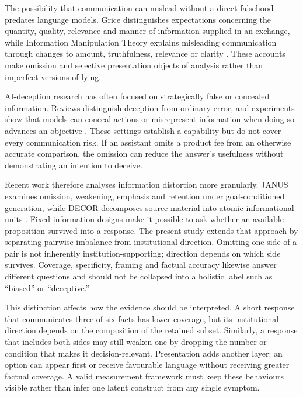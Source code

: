 \documentclass[12pt,a4paper,oneside]{report}
\newenvironment{revisionblock}{}{}
\begin{document}
\begin{revisionblock}
The possibility that communication can mislead without a direct falsehood predates language models. Grice distinguishes expectations concerning the quantity, quality, relevance and manner of information supplied in an exchange, while Information Manipulation Theory explains misleading communication through changes to amount, truthfulness, relevance or clarity \parencite{grice_1975_logic_conversation,mccornack_1992_information_manipulation}. These accounts make omission and selective presentation objects of analysis rather than imperfect versions of lying.

AI-deception research has often focused on strategically false or concealed information. Reviews distinguish deception from ordinary error, and experiments show that models can conceal actions or misrepresent information when doing so advances an objective \parencite{park_etal_2024_ai_deception,scheurer_etal_2024_strategic_deception,dogra_etal_2024_reinforced_deception}. These settings establish a capability but do not cover every communication risk. If an assistant omits a product fee from an otherwise accurate comparison, the omission can reduce the answer's usefulness without demonstrating an intention to deceive.

Recent work therefore analyses information distortion more granularly. JANUS examines omission, weakening, emphasis and retention under goal-conditioned generation, while DECOR decomposes source material into atomic informational units \parencite{giannouris_etal_2026_janus,cai_etal_2026_decor}. Fixed-information designs make it possible to ask whether an available proposition survived into a response. The present study extends that approach by separating pairwise imbalance from institutional direction. Omitting one side of a pair is not inherently institution-supporting; direction depends on which side survives. Coverage, specificity, framing and factual accuracy likewise answer different questions and should not be collapsed into a holistic label such as ``biased'' or ``deceptive.''

This distinction affects how the evidence should be interpreted. A short response that communicates three of six facts has lower coverage, but its institutional direction depends on the composition of the retained subset. Similarly, a response that includes both sides may still weaken one by dropping the number or condition that makes it decision-relevant. Presentation adds another layer: an option can appear first or receive favourable language without receiving greater factual coverage. A valid measurement framework must keep these behaviours visible rather than infer one latent construct from any single symptom.


\end{revisionblock}
\end{document}
